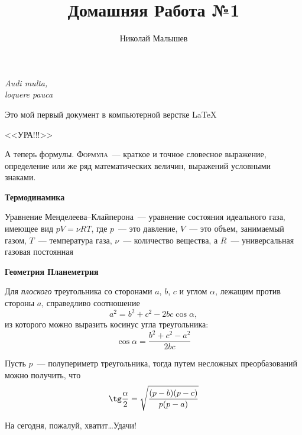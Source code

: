 \documentclass[12pt]{article}
\title{Домашняя Работа №1}
\author{Николай Малышев}
\date{}
\begin{document}
	\maketitle
	\begin{flushright}
		\itshape{ Audi multa,\\loquere pauca}
	\end{flushright}
	\vspace{20pt}\par
	Это мой первый документ в компьютерной верстке \LaTeX 
	\begin{center}
		\sffamily\Large{<<УРА!!!>>}
	\end{center}\par
	А теперь формулы. {\scshape Формула}~--- краткое и точное словесное выражение, определение или же ряд  математических величин, выражений условными знаками.
	
	\vspace{15pt}
	\begin{flushleft}
	\hspace{28pt} {\bfseries \large Термодинамика} 
	\end{flushleft}
	
	
	Уравнение Менделеева--Клайперона~--- уравнение состояния идеального газа, имеющее вид $pV = \nu RT$, где $p$~--- это давление, $V$~--- это объем, занимаемый газом, $T$~--- температура газа, $\nu$~--- количество вещества, а $R$~--- универсальная газовая постоянная
	
	\vspace{15pt}
	\begin{flushleft}
	\hspace{28pt} {\bfseries \large Геометрия \hfill Планеметрия} 
	\end{flushleft}
	 
	
	Для {\slshape плоского} треугольника со сторонами $a$, $b$, $c$ и углом $\alpha$, лежащим против стороны $a$, справедливо соотношение
	$$ a^2 = b^2 + c^2 - 2bc \cos\alpha, $$ 
	из которого можно выразить косинус угла треугольника:
	$$
	\cos\alpha = {\frac{b^2 + c^2 - a^2}{2bc}}
	$$ \par
	Пусть $p$~--- полупериметр треугольника, тогда путем несложных преорбазований можно получить, что
	$$
	\tg\frac{\alpha}{2} = \sqrt{\frac{(p - b)(p - c)}{p(p - a)}}
	$$
	\vspace{1cm}
	\begin{flushleft}
		На сегодня, пожалуй, хватит\ldots Удачи!
	\end{flushleft}
\end{document}
